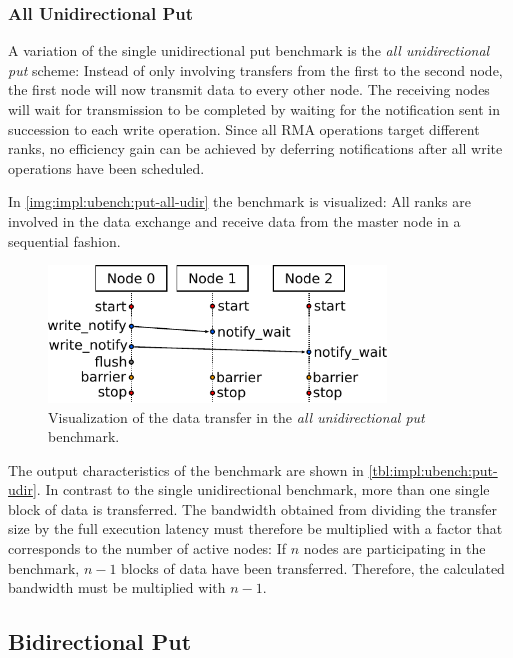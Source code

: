 \subsubsection*{All Unidirectional Put}

A variation of the single unidirectional put benchmark is the \emph{all unidirectional put} scheme: Instead of only involving transfers from the first to the second node, the first node will now transmit data to every other node. The receiving nodes will wait for transmission to be completed by waiting for the notification sent in succession to each write operation. Since all \ac{RMA} operations target different ranks, no efficiency gain can be achieved by deferring notifications after all write operations have been scheduled.

In \autoref{img:impl:ubench:put-all-udir} the benchmark is visualized: All ranks are involved in the data exchange and receive data from the master node in a sequential fashion.


\begin{figure}[htb]
\centering
\includegraphics[width=0.8\textwidth]{img/bench-put-all-udir}
\caption{Visualization of the data transfer in the \emph{all unidirectional put} benchmark.}
\label{img:impl:ubench:put-all-udir}
\end{figure}

The output characteristics of the benchmark are shown in \autoref{tbl:impl:ubench:put-udir}. In contrast to the single unidirectional benchmark, more than one single block of data is transferred. The bandwidth obtained from dividing the transfer size by the full execution latency must therefore be multiplied with a factor that corresponds to the number of active nodes: If $n$ nodes are participating in the benchmark, $n-1$ blocks of data have been transferred. Therefore, the calculated bandwidth must be multiplied with $n-1$.


\subsection{Bidirectional Put}
\label{ssec:impl:ubench:put-bdir}

